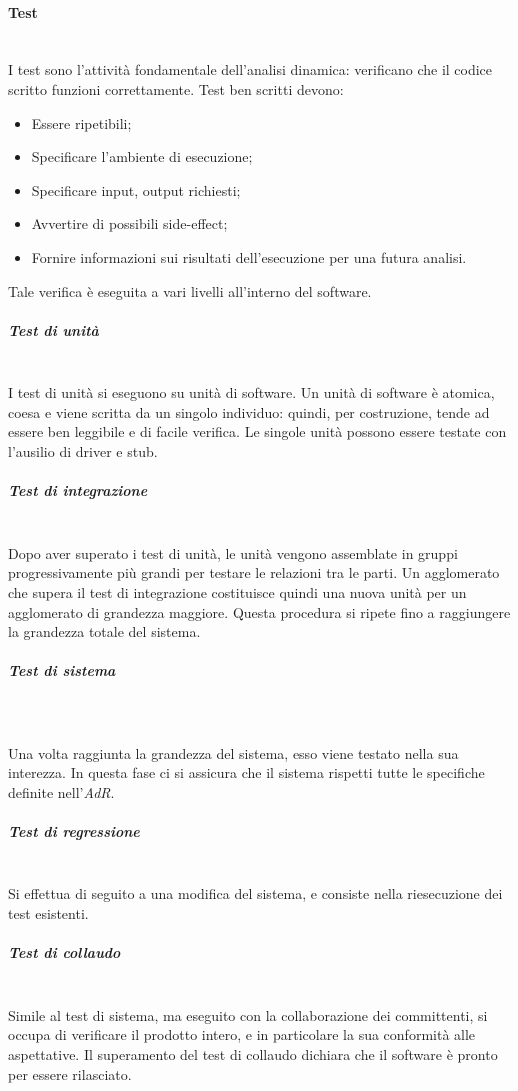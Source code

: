 			\paragraph{Test} \mbox{}\\	
			I test sono l'attività fondamentale dell'analisi dinamica: verificano che il codice scritto funzioni correttamente. Test ben scritti devono:
			\begin{itemize}
				\item Essere ripetibili;
				\item Specificare l'ambiente di esecuzione;
				\item Specificare input, output richiesti;
				\item Avvertire di possibili side-effect;
				\item Fornire informazioni sui risultati dell'esecuzione per una futura analisi.
			\end{itemize}			
			Tale verifica è eseguita a vari livelli all'interno del software.
				\subparagraph{Test di unità} \mbox{}\\
				I test di unità si eseguono su unità di software. Un unità di software è atomica, coesa e viene scritta da un singolo individuo: quindi, per costruzione, tende ad essere ben leggibile e di facile verifica. Le singole unità possono essere testate con l'ausilio di driver e stub.
				\subparagraph{Test di integrazione} \mbox{}\\
				Dopo aver superato i test di unità, le unità vengono assemblate in gruppi progressivamente più grandi per testare le relazioni tra le parti. Un agglomerato che supera il test di integrazione costituisce quindi una nuova unità per un agglomerato di grandezza maggiore. Questa procedura si ripete fino a raggiungere la grandezza totale del sistema.
				\subparagraph{Test di sistema} \mbox{}\\\\
				Una volta raggiunta la grandezza del sistema, esso viene testato nella sua interezza. In questa fase ci si assicura che il sistema rispetti tutte le specifiche definite nell'\textit{AdR}.
				\subparagraph{Test di regressione} \mbox{}\\
				Si effettua di seguito a una modifica del sistema, e consiste nella riesecuzione dei test esistenti.
				\subparagraph{Test di collaudo} \mbox{}\\
				Simile al test di sistema, ma eseguito con la collaborazione dei committenti, si occupa di verificare il prodotto intero, e in particolare la sua conformità alle aspettative. Il superamento del test di collaudo dichiara che il software è pronto per essere rilasciato.
